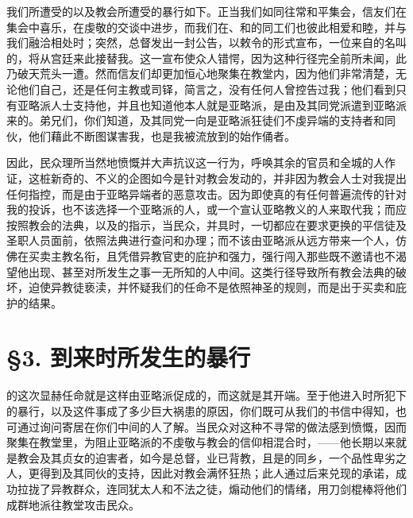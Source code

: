 我们所遭受的以及教会所遭受的暴行如下。正当我们如同往常和平集会，信友们在集会中喜乐，在虔敬的交谈中进步，而我们在、和的同工们也彼此相爱和睦，并与我们融洽相处时；突然，总督发出一封公告，以敕令的形式宣布，一位来自的名叫的，将从宫廷来此接替我。这一宣布使众人错愕，因为这种行径完全前所未闻，此乃破天荒头一遭。然而信友们却更加恒心地聚集在教堂内，因为他们非常清楚，无论他们自己，还是任何主教或司铎，简言之，没有任何人曾控告过我；他们看到只有亚略派人士支持他，并且也知道他本人就是亚略派，是由及其同党派遣到亚略派来的。弟兄们，你们知道，及其同党一向是亚略派狂徒们不虔异端的支持者和同伙，他们藉此不断图谋害我，也是我被流放到的始作俑者。\par

因此，民众理所当然地愤慨并大声抗议这一行为，呼唤其余的官员和全城的人作证，这桩新奇的、不义的企图如今是针对教会发动的，并非因为教会人士对我提出任何指控，而是由于亚略异端者的恶意攻击。因为即使真的有任何普遍流传的针对我的投诉，也不该选择一个亚略派的人，或一个宣认亚略教义的人来取代我；而应按照教会的法典，以及的指示，当民众，并具时，一切都应在要求更换的平信徒及圣职人员面前，依照法典进行查问和办理；而不该由亚略派从远方带来一个人，仿佛在买卖主教名衔，且凭借异教官吏的庇护和强力，强行闯入那些既不邀请也不渴望他出现、甚至对所发生之事一无所知的人中间。这类行径导致所有教会法典的破坏，迫使异教徒亵渎，并怀疑我们的任命不是依照神圣的规则，而是出于买卖和庇护的结果。\par


\section{§3. 到来时所发生的暴行}

的这次显赫任命就是这样由亚略派促成的，而这就是其开端。至于他进入时所犯下的暴行，以及这件事成了多少巨大祸患的原因，你们既可从我们的书信中得知，也可通过询问寄居在你们中间的人了解。当民众对这种不寻常的做法感到愤慨，因而聚集在教堂里，为阻止亚略派的不虔敬与教会的信仰相混合时，——他长期以来就是教会及其贞女的迫害者，如今是总督，业已背教，且是的同乡，一个品性卑劣之人，更得到及其同伙的支持，因此对教会满怀狂热；此人通过后来兑现的承诺，成功拉拢了异教群众，连同犹太人和不法之徒，煽动他们的情绪，用刀剑棍棒将他们成群地派往教堂攻击民众。\par


